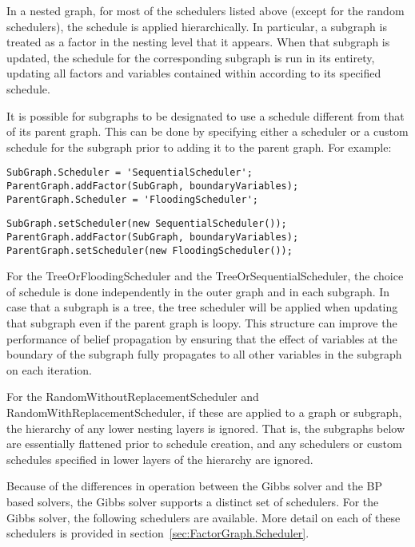 In a nested graph, for most of the schedulers listed above (except for the random schedulers), the schedule is applied hierarchically.  In particular, a subgraph is treated as a factor in the nesting level that it appears.  When that subgraph is updated, the schedule for the corresponding subgraph is run in its entirety, updating all factors and variables contained within according to its specified schedule.

It is possible for subgraphs to be designated to use a schedule different from that of its parent graph.  This can be done by specifying either a scheduler or a custom schedule for the subgraph prior to adding it to the parent graph.  For example:

\ifmatlab

\begin{lstlisting}
SubGraph.Scheduler = 'SequentialScheduler';
ParentGraph.addFactor(SubGraph, boundaryVariables);
ParentGraph.Scheduler = 'FloodingScheduler';
\end{lstlisting}

\fi

\ifjava

\begin{lstlisting}
SubGraph.setScheduler(new SequentialScheduler());
ParentGraph.addFactor(SubGraph, boundaryVariables);
ParentGraph.setScheduler(new FloodingScheduler());
\end{lstlisting}

\fi

For the TreeOrFloodingScheduler and the TreeOrSequentialScheduler, the choice of schedule is done independently in the outer graph and in each subgraph.  In case that a subgraph is a tree, the tree scheduler will be applied when updating that subgraph even if the parent graph is loopy.  This structure can improve the performance of belief propagation by ensuring that the effect of variables at the boundary of the subgraph fully propagates to all other variables in the subgraph on each iteration.

For the RandomWithoutReplacementScheduler and RandomWithReplacementScheduler, if these are applied to a graph or subgraph, the hierarchy of any lower nesting layers is ignored.  That is, the subgraphs below are essentially flattened prior to schedule creation, and any schedulers or custom schedules specified in lower layers of the hierarchy are ignored.


Because of the differences in operation between the Gibbs solver and the BP based solvers, the Gibbs solver supports a distinct set of schedulers.  For the Gibbs solver, the following schedulers are available.  More detail on each of these schedulers is provided in section~\ref{sec:FactorGraph.Scheduler}.

